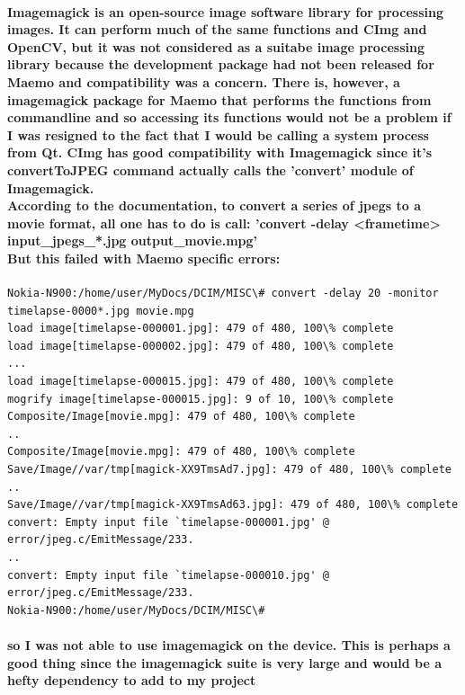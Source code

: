 \documentclass[11pt]{article} %
\begin{document}
\paragraph{Imagemagick is an open-source image software library for processing images. It can perform much of the same functions and CImg and OpenCV, but it was not considered as a suitabe image processing library because the development package had not been released for Maemo and compatibility was a concern. There is, however, a imagemagick package for Maemo that performs the functions from commandline and so accessing its functions would not be a problem if I was resigned to the fact that I would be calling a system process from Qt. CImg has good compatibility with Imagemagick since it's convertToJPEG command actually calls the 'convert' module of Imagemagick.\\
According to the documentation, to convert a series of jpegs to a movie format, all one has to do is call:
'convert -delay <frametime> input\_jpegs\_*.jpg output\_movie.mpg'\\
But this failed with Maemo specific errors:}
\begin{verbatim}
Nokia-N900:/home/user/MyDocs/DCIM/MISC\# convert -delay 20 -monitor timelapse-0000*.jpg movie.mpg
load image[timelapse-000001.jpg]: 479 of 480, 100\% complete
load image[timelapse-000002.jpg]: 479 of 480, 100\% complete
...
load image[timelapse-000015.jpg]: 479 of 480, 100\% complete
mogrify image[timelapse-000015.jpg]: 9 of 10, 100\% complete
Composite/Image[movie.mpg]: 479 of 480, 100\% complete
..
Composite/Image[movie.mpg]: 479 of 480, 100\% complete
Save/Image//var/tmp[magick-XX9TmsAd7.jpg]: 479 of 480, 100\% complete
..
Save/Image//var/tmp[magick-XX9TmsAd63.jpg]: 479 of 480, 100\% complete
convert: Empty input file `timelapse-000001.jpg' @ error/jpeg.c/EmitMessage/233.
..
convert: Empty input file `timelapse-000010.jpg' @ error/jpeg.c/EmitMessage/233.
Nokia-N900:/home/user/MyDocs/DCIM/MISC\# 
\end{verbatim}
\paragraph{so I was not able to use imagemagick on the device. This is perhaps a good thing since the imagemagick suite is very large and would be a hefty dependency to add to my project
}
\end{document}
